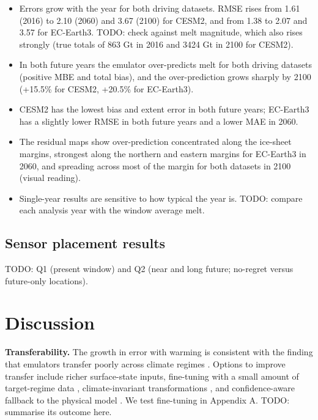\documentclass[tc, manuscript]{copernicus}
\providecommand{\tightlist}{\setlength{\itemsep}{0pt}\setlength{\parskip}{0pt}}
\begin{document}
\begin{itemize}
\tightlist
\item
  Errors grow with the year for both driving datasets. RMSE rises from
  1.61 (2016) to 2.10 (2060) and 3.67 (2100) for CESM2, and from 1.38 to
  2.07 and 3.57 for EC-Earth3. TODO: check against melt magnitude, which
  also rises strongly (true totals of 863 Gt in 2016 and 3424 Gt in 2100
  for CESM2).
\item
  In both future years the emulator over-predicts melt for both driving
  datasets (positive MBE and total bias), and the over-prediction grows
  sharply by 2100 (+15.5\% for CESM2, +20.5\% for EC-Earth3).
\item
  CESM2 has the lowest bias and extent error in both future years;
  EC-Earth3 has a slightly lower RMSE in both future years and a lower
  MAE in 2060.
\item
  The residual maps show over-prediction concentrated along the
  ice-sheet margins, strongest along the northern and eastern margins
  for EC-Earth3 in 2060, and spreading across most of the margin for
  both datasets in 2100 (visual reading).
\item
  Single-year results are sensitive to how typical the year is. TODO:
  compare each analysis year with the window average melt.
\end{itemize}

\subsection{Sensor placement results}\label{sensor-placement-results}

TODO: Q1 (present window) and Q2 (near and long future; no-regret versus
future-only locations).

\section{Discussion}\label{discussion}

\textbf{Transferability.} The growth in error with warming is consistent
with the finding that emulators transfer poorly across climate regimes
\citep{schlager_preprint}. Options to improve transfer include richer
surface-state inputs, fine-tuning with a small amount of target-regime
data \citep{dheeshjith2024}, climate-invariant transformations
\citep{beucler2024}, and confidence-aware fallback to the physical model
\citep{heuer2025}. We test fine-tuning in Appendix A. TODO: summarise
its outcome here.
\end{document}
